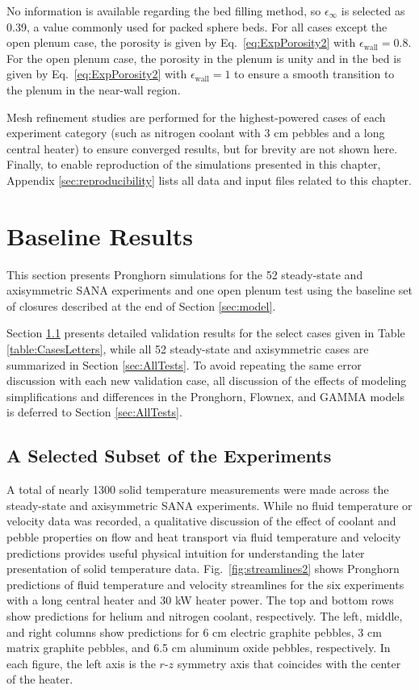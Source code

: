 No information is available regarding the bed filling method, so \(\epsilon_\infty\) is selected as 0.39, a value commonly used for packed sphere beds. For all cases except the open plenum case, the porosity is given by Eq.\ \eqref{eq:ExpPorosity2} with \(\epsilon_\text{wall}=0.8\). For the open plenum case, the porosity in the plenum is unity and in the bed is given by Eq.\ \eqref{eq:ExpPorosity2} with \(\epsilon_\text{wall}=1\) to ensure a smooth transition to the plenum in the near-wall region.

Mesh refinement studies are performed for the highest-powered cases of each experiment category (such as nitrogen coolant with 3 \si{\centi\meter} pebbles and a long central heater) to ensure converged results, but for brevity are not shown here. Finally, to enable reproduction of the simulations presented in this chapter, Appendix \ref{sec:reproducibility} lists all data and input files related to this chapter.

\section{Baseline Results}
\label{sec:baseline}

This section presents Pronghorn simulations for the 52 steady-state and axisymmetric SANA experiments and one open plenum test using the baseline set of closures described at the end of Section \ref{sec:model}. 

Section \ref{sec:sana_subset} presents detailed validation results for the select cases given in Table \ref{table:CasesLetters}, while all 52 steady-state and axisymmetric cases are summarized in Section \ref{sec:AllTests}. To avoid repeating the same error discussion with each new validation case, all discussion of the effects of modeling simplifications and differences in the Pronghorn, Flownex, and GAMMA models is deferred to Section \ref{sec:AllTests}.

\subsection{A Selected Subset of the Experiments}
\label{sec:sana_subset}

A total of nearly 1300 solid temperature measurements were made across the steady-state and axisymmetric SANA experiments. While no fluid temperature or velocity data was recorded, a qualitative discussion of the effect of coolant and pebble properties on flow and heat transport via fluid temperature and velocity predictions provides useful physical intuition for understanding the later presentation of solid temperature data. Fig.\ \ref{fig:streamlines2} shows Pronghorn predictions of fluid temperature and velocity streamlines for the six experiments with a long central heater and 30 \si{\kilo\watt} heater power. The top and bottom rows show predictions for helium and nitrogen coolant, respectively. The left, middle, and right columns show predictions for 6 \si{\centi\meter} electric graphite pebbles, 3 \si{\centi\meter} matrix graphite pebbles, and 6.5 \si{\centi\meter} aluminum oxide pebbles, respectively. In each figure, the left axis is the $r$-$z$ symmetry axis that coincides with the center of the heater.

